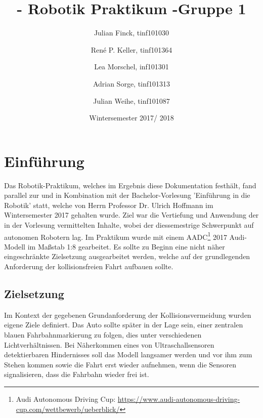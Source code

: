 \documentclass[12pt,a4paper]{report}
\begin{document}

\title{- Robotik Praktikum -\endgraf Gruppe 1}
\author{
  Julian Finck, tinf101030 \and
  René P. Keller, tinf101364 \and
  Lea Morschel, inf101301 \and
  Adrian Sorge, tinf101313 \and
  Julian Weihe, tinf101087}
\date{Wintersemester 2017/ 2018}
\maketitle

\newpage
\tableofcontents %
\newpage




\chapter{Einführung}

Das Robotik-Praktikum, welches im Ergebnis diese Dokumentation festhält, fand parallel zur und in Kombination mit der Bachelor-Vorlesung 'Einführung in die Robotik' statt, welche von Herrn Professor Dr. Ulrich Hoffmann im Wintersemester 2017 gehalten wurde.
Ziel war die Vertiefung und Anwendung der in der Vorlesung vermittelten Inhalte, wobei der diessemestrige Schwerpunkt  auf autonomen Robotern lag. Im Praktikum wurde mit einem AADC\footnote{Audi Autonomous Driving Cup: \url{https://www.audi-autonomous-driving-cup.com/wettbewerb/ueberblick/}} 2017 Audi-Modell im Maßstab 1:8 gearbeitet. Es sollte zu Beginn eine nicht näher eingeschränkte Zielsetzung ausgearbeitet werden, welche auf der grundlegenden Anforderung der kollisionsfreien Fahrt aufbauen sollte.

\section{Zielsetzung}

Im Kontext der gegebenen Grundanforderung der Kollisionsvermeidung wurden eigene Ziele definiert. Das Auto sollte später in der Lage sein, einer zentralen blauen Fahrbahnmarkierung zu folgen, dies unter verschiedenen Lichtverhältnissen. Bei Näherkommen eines von Ultraschallsensoren detektierbaren Hindernisses soll das Modell langsamer werden und vor ihm zum Stehen kommen sowie die Fahrt erst wieder aufnehmen, wenn die Sensoren signalisieren, dass die Fahrbahn wieder frei ist.
\end{document}

